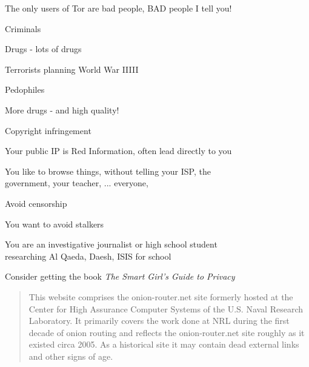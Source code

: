 \documentclass[20pt,landscape,a4paper,footrule]{foils}
\begin{document}

The only users of Tor are bad people, BAD people I tell you!
\begin{list1}
\item Criminals
\item Drugs - lots of drugs
\item Terrorists planning World War IIIII
\item Pedophiles
\item More drugs - and high quality!
\item Copyright infringement
\end{list1}


\begin{list1}
\item Your public IP is {\color{red}Red Information}, often lead directly to you
\item You like to browse things, without telling your ISP, the\\
government, your teacher, ... everyone,
\item Avoid censorship
\item You want to avoid stalkers
\item You are an investigative journalist or high school student\\
researching Al Qaeda, Daesh, ISIS for school
\item Consider getting the book \emph{The Smart Girl's Guide to Privacy}\\ 
\end{list1}







\begin{quote}
This website comprises the onion-router.net site formerly hosted at the Center
for High Assurance Computer Systems of the U.S. Naval Research Laboratory.
It primarily covers the work done at NRL during the first decade of onion routing
and reflects the onion-router.net site roughly as it existed circa 2005. As a
historical site it may contain dead external links and other signs of age.
\end{quote}
\end{document}
